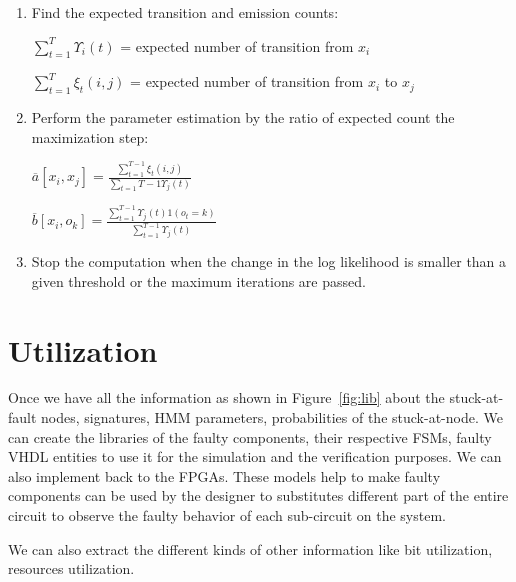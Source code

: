 \begin{enumerate}
\begin{itemize}
\end{itemize}
\item Find the expected transition and emission counts:

$\sum\limits_{t = 1}^{ T } \Upsilon_i (t)$ = expected number of transition from $x_i$

$\sum\limits_{t = 1}^{ T} \xi_t (i ,j)$ = expected number of transition from $x_i$ to $x_j$

\item Perform the parameter estimation by the ratio of expected count the maximization step:


$\overline{a}[x_i, x_j] = \frac{\sum\limits_{t = 1}^{T - 1}\xi_{t} (i, j)}{\sum\limits_{t = 1} T - 1 \Upsilon_{j}(t)} $




$\overline{b}[x_i, o_k] = \frac{\sum\limits_{t = 1}^{T - 1}\Upsilon_{j} (t) 1 (o_t = k)}{\sum\limits_{t = 1}^{T - 1} \Upsilon_{j}(t)} $

\item Stop the computation when the change in the log likelihood is smaller than a given threshold or the maximum iterations are passed.

\end{enumerate} 















\section{Utilization}



Once we have all the information as shown in Figure~\ref{fig:lib} about the stuck-at-fault nodes, signatures, HMM parameters, probabilities of the stuck-at-node. We can create the libraries of the faulty components, their respective FSMs, faulty VHDL entities to use it for the simulation and the verification purposes. We can also implement back to the FPGAs. These models help to make faulty components can be used by the designer to substitutes different part of the entire circuit to observe the faulty behavior of each sub-circuit on the system.


 We can also extract the different kinds of other information like bit utilization, resources utilization.


